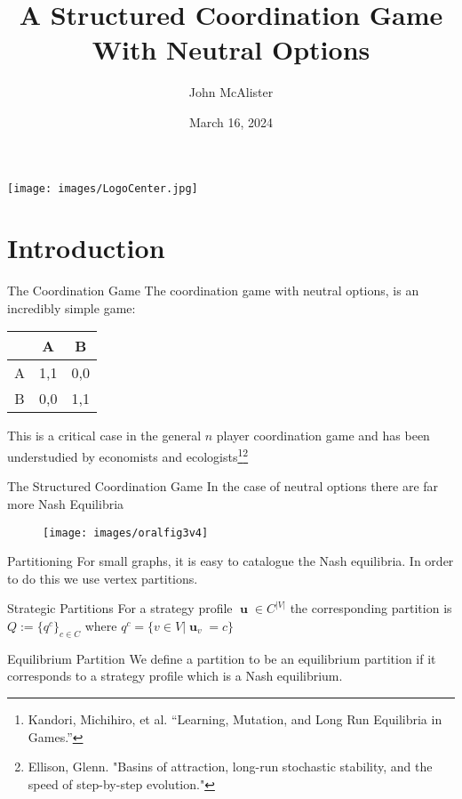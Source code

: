 \documentclass{beamer}
\title{A Structured Coordination Game With Neutral Options}
\author{John McAlister}
\institute[Fefferman Lab]{University of Tennessee - Knoxville}
\date{March 16, 2024}
\DeclareMathOperator{\uu}{\mathbf{u}}
\begin{document}
\begin{frame}[plain]
    \centering
    \maketitle
    \texttt{[image: images/LogoCenter.jpg]}
\end{frame}
\section{Introduction}
\begin{frame}{The Coordination Game}
	The coordination game with neutral options, is an incredibly simple game:
	\begin{center} 
		\begin{tabular}{c|cc}
			&A&B\\
			\hline 
			A&1,1&0,0\\
			B&0,0&1,1
		\end{tabular}
	\end{center}
	This is a critical case in the general $n$ player coordination game and has been understudied by economists and ecologists\footnote{Kandori, Michihiro, et al. “Learning, Mutation, and Long Run Equilibria in Games.”}\footnote{Ellison, Glenn. "Basins of attraction, long-run stochastic stability, and the speed of step-by-step evolution."}
	
\end{frame}

\begin{frame}{The Structured Coordination Game}
	In the case of neutral options there are far more Nash Equilibria
	\begin{figure}
		\texttt{[image: images/oralfig3v4]}
	\end{figure}
\end{frame}

\begin{frame}{Partitioning}
	For small graphs, it is easy to catalogue the Nash equilibria. In order to do this we use vertex partitions.  
	\begin{block}{Strategic Partitions}
		For a strategy profile $\uu\in C^{|V|}$ the corresponding partition is $Q:=\{q^c\}_{c\in C}$ where $q^c=\{v\in V|\uu_v=c\}$
	\end{block}  
	\begin{block}{Equilibrium Partition}
		We define a partition to be an equilibrium partition if it corresponds to a strategy profile which is a Nash equilibrium. 
	\end{block}
\end{frame}
\end{document}
